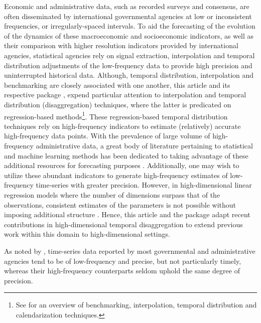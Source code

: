 Economic and administrative data, such as recorded surveys and consensus, are often disseminated by international governmental agencies at low or inconsistent frequencies, or irregularly-spaced intervals. To aid the forecasting of the evolution of the dynamics of these macroeconomic and socioeconomic indicators, as well as their comparison with higher resolution indicators provided by international agencies, statistical agencies rely on signal extraction, interpolation and temporal distribution adjustments of the low-frequency data to provide high precision and uninterrupted historical data. Although, temporal distribution, interpolation and benchmarking are closely associated with one another, this article and its respective package \citep[,][]{DisaggregateTS}, expend particular attention to interpolation and temporal distribution (disaggregation) techniques, where the latter is predicated on regression-based methods\footnote{See \citet{dagum2006benchmarking} for an overview of benchmarking, interpolation, temporal distribution and calendarization techniques.}. These regression-based temporal distribution techniques rely on high-frequency indicators to estimate (relatively) accurate high-frequency data points. With the prevalence of large volume of high-frequency administrative data, a great body of literature pertaining to statistical and machine learning methods has been dedicated to taking advantage of these additional resources for forecasting purposes \citep[see][ for an overview of macroeconomic forecasting in the presence of big data]{fuleky2019macroeconomic}. Additionally, one may wish to utilize these abundant indicators to generate high-frequency estimates of low-frequency time-series with greater precision. However, in high-dimensional linear regression models where the number of dimensions surpass that of the observations, consistent estimates of the parameters is not possible without imposing additional structure \citep[see][]{wainwright2019high}. Hence, this article and the package  adapt recent contributions in high-dimensional temporal disaggregation \citep[see][]{10-1111rssa-12952} to extend previous work within this domain \citep[see the package ][ and its corresponding article \citet{sax2013temporal2}]{sax2016package} to high-dimensional settings.

As noted by \citet{dagum2006benchmarking}, time-series data reported by most governmental and administrative agencies tend to be of low-frequency and precise, but not particularly timely, whereas their high-frequency counterparts seldom uphold the same degree of precision.

